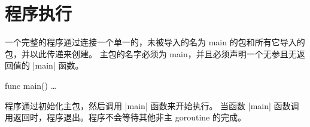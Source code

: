 \section{程序执行}
一个完整的程序通过连接一个单一的，未被导入的名为 main 的包和所有它导入的包，并以此传递来创建。
主包的名字必须为 main，并且必须声明一个无参且无返回值的 \code|main| 函数。
\begin{golang}
func main() { … }
\end{golang}
程序通过初始化主包，然后调用 \code|main| 函数来开始执行。
当函数 \code|main| 函数调用返回时，程序退出。程序不会等待其他非主 goroutine 的完成。
































